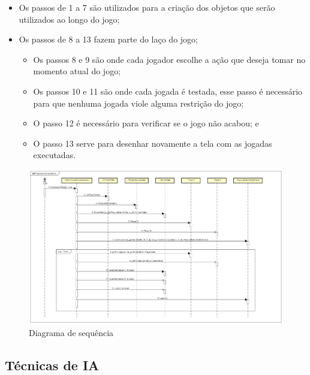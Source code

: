 \begin{itemize}
	\item Os passos de 1 a 7 são utilizados para a criação dos objetos que serão utilizados ao longo do jogo;
	\item Os passos de 8 a 13 fazem parte do laço do jogo;
	\begin{itemize}
		\item Os passos 8 e 9 são onde cada jogador escolhe a ação que deseja tomar no momento atual do jogo;
		\item Os passos 10 e 11 são onde cada jogada é testada, esse passo é necessário para que nenhuma jogada viole alguma restrição do jogo; 
		\item O passo 12 é necessário para verificar se o jogo não acabou; e
		\item O passo 13 serve para desenhar novamente a tela com as jogadas executadas.
	\end{itemize}
\end{itemize}

\begin{figure}[ht]
	\centering
	\includegraphics[width=1\textwidth]{fig/diagramaSequencia.pdf}
	\caption{Diagrama de sequência}
	\label{fig:sequencia}
\end{figure}


\subsection{Técnicas de IA}

